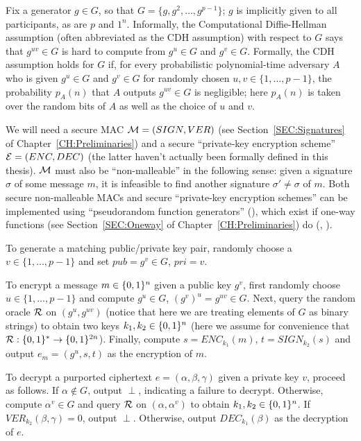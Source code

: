 Fix a generator $g \in G$, so that $G = \{g, g^2, \ldots, g^{p-1}\}$; 
$g$ is implicitly given to all participants, as are $p$ and $1^n$.
Informally, the Computational Diffie-Hellman assumption (often abbreviated as
the CDH assumption) with respect to $G$ says that $g^{uv} \in G$ is hard to
compute from $g^u \in G$ and $g^v \in G$.  Formally, the CDH assumption holds
for $G$ if, for every probabilistic polynomial-time adversary $A$ who is given
$g^u \in G$ and $g^v \in G$ for randomly chosen $u,v \in \{1, \ldots, p-1\}$,
the probability $p_A(n)$ that $A$ outputs $g^{uv} \in G$ is negligible; here
$p_A(n)$ is taken over the random bits of $A$ as well as the choice of $u$ and
$v$.  

We will need a secure MAC $\mathcal{M} = (SIGN,VER)$ (see
Section~\ref{SEC:Signatures} of Chapter~\ref{CH:Preliminaries}) and a secure
``private-key encryption scheme'' $\mathcal{E} = (ENC,DEC)$ (the latter haven't
actually been formally defined in this thesis). $\mathcal{M}$ must also be
``non-malleable'' in the following sense: given a signature $\sigma$ of some
message $m$, it is infeasible to find another signature $\sigma' \neq \sigma$
of $m$.
Both secure non-malleable MACs and secure ``private-key encryption schemes''
can be implemented using ``pseudorandom function generators''
(\cite{goldreich:pseudorandom2}), which exist if one-way functions (see
Section~\ref{SEC:Oneway} of Chapter~\ref{CH:Preliminaries}) do
(\cite{goldreich:pseudorandom1}, \cite{goldreich:pseudorandom3}).   

To generate a matching public/private key pair, randomly choose a $v \in
\{1,\ldots,p-1\}$ and set $pub = g^v \in G$, $pri = v$. 

To encrypt a message $m \in \{0,1\}^{n}$ given a public key $g^v$, 
first randomly choose $u \in \{1,\ldots,p-1\}$ and compute $g^u
\in G$, $(g^v)^u = g^{uv} \in G$. Next, query the random oracle $\mathcal{R}$ on
$(g^u, g^{uv})$ (notice that here we are treating elements of $G$ as binary
strings) to obtain two keys $k_1,k_2 \in \{0,1\}^{n}$ (here we assume for
convenience that $\mathcal{R} : \{0,1\}^{*} \to \{0,1\}^{2n}$). Finally, compute $s =
ENC_{k_1}(m)$, $t = SIGN_{k_2}(s)$ and output $e_m = (g^u,s,t)$ as the
encryption of $m$. 

To decrypt a purported ciphertext $e = (\alpha,\beta,\gamma)$ given a private
key $v$, proceed as follows. If $\alpha \notin G$, output $\perp$, indicating
a failure to decrypt. Otherwise, compute $\alpha^v \in G$ and query $\mathcal{R}$ on
$(\alpha,\alpha^v)$ to obtain $k_1, k_2 \in \{0,1\}^{n}$. If
$VER_{k_2}(\beta,\gamma) = 0$, output $\perp$. Otherwise, output
$DEC_{k_1}(\beta)$ as the decryption of $e$.


